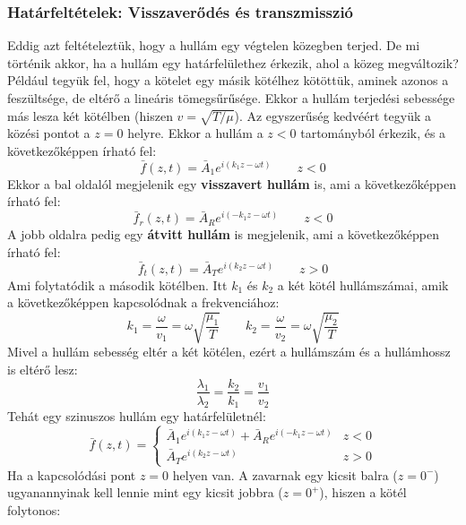 \documentclass[../main.tex]{subfiles}
\begin{document}
\subsubsection{Határfeltételek: Visszaverődés és transzmisszió}
Eddig azt feltételeztük, hogy a hullám egy végtelen közegben terjed. De mi történik akkor, ha a hullám egy határfelülethez érkezik, ahol a közeg megváltozik?
Például tegyük fel, hogy a kötelet egy másik kötélhez kötöttük, aminek azonos a feszültsége, de eltérő a lineáris tömegsűrűsége. Ekkor a hullám terjedési sebessége más lesza két kötélben (hiszen $v = \sqrt{T/\mu}$).
Az egyszerűség kedvéért tegyük a közési pontot a $z=0$ helyre. Ekkor a hullám a $z<0$ tartományból érkezik, és a következőképpen írható fel:
\begin{equation}
    \bar{f}(z, t) = \bar{A}_1 e^{i(k_1 z - \omega t)} \qquad z < 0
\end{equation}
Ekkor a bal oldalól megjelenik egy \textbf{visszavert hullám} is, ami a következőképpen írható fel:
\begin{equation}
    \bar{f}_r(z, t) = \bar{A}_R e^{i(-k_1 z - \omega t)} \qquad z < 0
\end{equation}
A jobb oldalra pedig egy \textbf{átvitt hullám} is megjelenik, ami a következőképpen írható fel:
\begin{equation}
    \bar{f}_t(z, t) = \bar{A}_T e^{i(k_2 z - \omega t)} \qquad z > 0
\end{equation}
Ami folytatódik a második kötélben. Itt $k_1$ és $k_2$ a két kötél hullámszámai, amik a következőképpen kapcsolódnak a frekvenciához:
\begin{equation}
    k_1 = \frac{\omega}{v_1} = \omega \sqrt{\frac{\mu_1}{T}} \qquad k_2 = \frac{\omega}{v_2} = \omega \sqrt{\frac{\mu_2}{T}}
\end{equation}
Mivel a hullám sebesség eltér a két kötélen, ezért a hullámszám és a hullámhossz is eltérő lesz:
\begin{equation}
    \frac{\lambda_1}{\lambda_2} = \frac{k_2}{k_1} = \frac{v_1}{v_2}
\end{equation}
Tehát egy szinuszos hullám egy határfelületnél:
\begin{equation}
    \bar{f}(z, t) = \begin{cases}
        \bar{A}_1 e^{i(k_1 z - \omega t)} + \bar{A}_R e^{i(-k_1 z - \omega t)} & z < 0 \\
        \bar{A}_T e^{i(k_2 z - \omega t)} & z > 0
    \end{cases}
\end{equation}
Ha a kapcsolódási pont $z=0$ helyen van. A zavarnak egy kicsit balra ($z = 0^-$) ugyanannyinak kell lennie mint egy kicsit jobbra ($z = 0^+$), hiszen a kötél folytonos:
\end{document}

